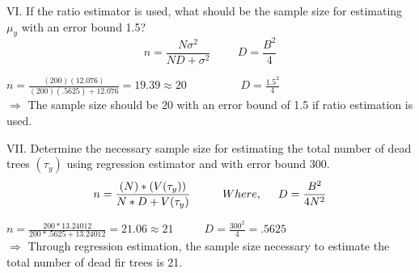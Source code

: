 \documentclass{article}
\begin{document}
VI. If the ratio estimator is used, what should be the sample size for estimating $\mu_y$ with an error bound 1.5? \\
\smallskip
\begin{equation}
    n = \frac{N \sigma^2}{N D + \sigma^2} \hspace{1cm} D = \frac{B^2}{4}
\end{equation}
\begin{center}
    $n = \frac{(200)(12.076)}{(200)(.5625) + 12.076} = 19.39 \approx 20  \hspace{2cm} D = \frac{1.5^2}{4} $\\
    \smallskip
    $\Rightarrow$ The sample size should be 20 with an error bound of 1.5 if ratio estimation is used. \\
\end{center}
\smallskip
VII. Determine the necessary sample size for estimating the total number of dead trees $(\tau_y)$ using regression estimator and with error bound 300. \\

\begin{equation}
    n = \frac{(N)*(V(\tau_y))}{N *D + V(\tau_y)} \hspace{1cm} Where, \hspace{.5cm} D = \frac{B^2}{4 N^2} \\
\end{equation}
\begin{center}
    $n = \frac{200*13.24012}{200*.5625 + 13.24012} = 21.06 \approx 21 $ \hspace{2cm} $\hspace{1cm} D = \frac{300^2}{4} = .5625 $ \\
    \smallskip
    $\Rightarrow$ Through regression estimation, the sample size necessary to estimate the total number of dead fir trees is 21. \\
\end{center}
\end{document}
